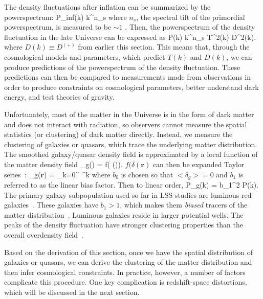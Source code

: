 The density fluctuations after inflation can be summarized by the powerspectrum: 
\beq
P_{\rm inf}(k) \propto k^{n_s}
\eeq
where $n_s$, the spectral tilt of the primordial powerspectrum, is measured to be 
$\sim 1$ \citep{Harrison:1970aa, Peebles:1970, Zeldovich:1972, Komatsu:2011aa}.
Then, the powerspectrum of the density fluctuation in the late Universe can be 
expressed as 
\beq
P(k) \propto k^{n_s} \; T^2(k) \; D^2(k).
\eeq
where $D(k) \equiv D^{(+)}$ from earlier this section. This means that, through 
the cosmological models and parameters, which predict $T(k)$ and $D(k)$, we can 
produce predictions of the powerspectrum of the density fluctuation. These
predictions can then be compared to measurements made from observations in 
order to produce constraints 
on cosmological parameters, better understand dark energy, and test theories of 
gravity. 

Unfortunately, most of the matter in the Universe is in the form of dark 
matter and does not interact with radiation, so observers cannot measure the 
spatial statistics (or clustering) of dark matter directly. 
Instead, we measure the clustering of galaxies or quasars, which trace
the underlying matter distribution. The smoothed galaxy/quasar density field is 
approximated by a local function of the matter density field
\beq
\delta_g() = f( \delta()). 
\eeq
$f(\delta(\bm{r})$ can then be expanded Taylor series~\citep{Fry:1993}:
\beq
\delta_g({\bf r}) = \sum\limits_{k=0}^{\infty}  \delta^k 
\eeq
where $b_0$ is chosen so that $<\delta_g> = 0$ and $b_1$ is referred to as 
the linear bias factor. Then to linear order, 
\beq
P_g(k) = b_1^2 P(k). 
\eeq
The primary galaxy subpopulation used so far in LSS studies are luminous 
red galaxies~\citep{Eisenstein:2001aa, Dawson:2013aa}. These galaxies have $b_1 > 1$,
which makes them {\em biased} tracers of the matter 
distribution~\citep{Zehavi:2005aa, Sheldon:2009aa,Gaztanaga:2009aa, Zhai:2016aa}.
Luminous galaxies reside in larger potential wells. The peaks of the density fluctuation
have stronger clustering properties than the overall overdensity field~\citep{Manera:2010aa}.

Based on the derivation of this section, once we have the spatial 
distribution of galaxies or quasars, we can derive the clustering of the matter
distribution and then infer cosmological constraints. In practice, however, a
number of factors complicate this procedure. One key complication is redshift-space
distortions, which will be discussed in the next section.

